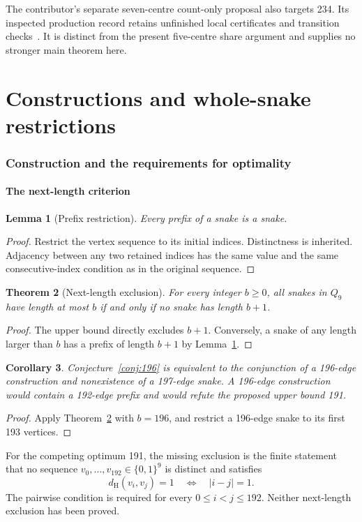 \documentclass[11pt,a4paper]{article}
\newtheorem{theorem}{Theorem}[section]
\newtheorem{lemma}[theorem]{Lemma}
\newtheorem{corollary}[theorem]{Corollary}
\theoremstyle{definition}
\theoremstyle{remark}
\newcommand{\Q}{Q}
\newcommand{\Ham}{d_{\mathrm H}}
\begin{document}
The contributor's separate seven-centre count-only proposal also targets 234.
Its inspected production record retains unfinished local certificates and
transition checks~\cite{conditional234archive}. It is distinct from the present
five-centre share argument and supplies no stronger main theorem here.

\part{Constructions and whole-snake restrictions}
\section{Construction and the requirements for optimality}\label{sec:optimality}
\subsection{The next-length criterion}
\begin{lemma}[Prefix restriction]\label{lem:prefix}
Every prefix of a snake is a snake.
\end{lemma}
\begin{proof}
Restrict the vertex sequence to its initial indices. Distinctness is inherited. Adjacency between any two retained indices has the same value and the same consecutive-index condition as in the original sequence.
\end{proof}

\begin{theorem}[Next-length exclusion]\label{thm:next}
For every integer $b\ge0$, all snakes in $\Q_9$ have length at most $b$ if and only if no snake has length $b+1$.
\end{theorem}
\begin{proof}
The upper bound directly excludes $b+1$. Conversely, a snake of any length larger than $b$ has a prefix of length $b+1$ by Lemma~\ref{lem:prefix}.
\end{proof}

\begin{corollary}
Conjecture~\ref{conj:196} is equivalent to the conjunction of a 196-edge construction and nonexistence of a 197-edge snake. A 196-edge construction would contain a 192-edge prefix and would refute the proposed upper bound 191.
\end{corollary}
\begin{proof}
Apply Theorem~\ref{thm:next} with $b=196$, and restrict a 196-edge snake to its first 193 vertices.
\end{proof}
For the competing optimum 191, the missing exclusion is the finite statement that no sequence $v_0,\ldots,v_{192}\in\{0,1\}^9$ is distinct and satisfies
\[
\Ham(v_i,v_j)=1\quad\Longleftrightarrow\quad |i-j|=1.
\]
The pairwise condition is required for every $0\le i<j\le192$. Neither next-length exclusion has been proved.
\end{document}

